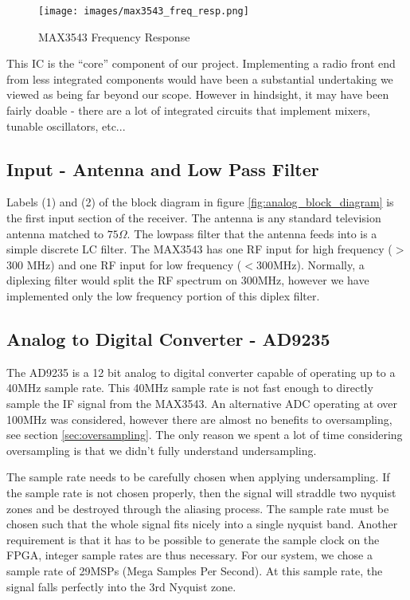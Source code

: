\documentclass[a4paper, 12pt, notitlepage]{article}
\begin{document}
\begin{figure}
  \texttt{[image: images/max3543\_freq\_resp.png]}
  \caption{MAX3543 Frequency Response}
  \label{fig:max3543_freq_resp}
\end{figure}

This IC is the ``core'' component of our project.  Implementing a radio front end from less integrated components would have been a substantial undertaking we viewed as being far beyond our scope.  However in hindsight, it may have been fairly doable - there are a lot of integrated circuits that implement mixers, tunable oscillators, etc...  

\subsection{Input - Antenna and Low Pass Filter}
Labels (1) and (2) of the block diagram in figure \ref{fig:analog_block_diagram} is the first input section of the receiver.  The antenna is any standard television antenna matched to $75\Omega$.  The lowpass filter that the antenna feeds into is a simple discrete LC filter.  The MAX3543 has one RF input for high frequency ($>$300 MHz) and one RF input for low frequency ($<$300MHz).  Normally, a diplexing filter would split the RF spectrum on 300MHz, however we have implemented only the low frequency portion of this diplex filter.

\subsection{Analog to Digital Converter - AD9235}
The AD9235 is a 12 bit analog to digital converter capable of operating up to a 40MHz sample rate.  This 40MHz sample rate is not fast enough to directly sample the IF signal from the MAX3543.  An alternative ADC operating at over 100MHz was considered, however there are almost no benefits to oversampling, see section \ref{sec:oversampling}.  The only reason we spent a lot of time considering oversampling is that we didn't fully understand undersampling.

The sample rate needs to be carefully chosen when applying undersampling.  If the sample rate is not chosen properly, then the signal will straddle two nyquist zones and be destroyed through the aliasing process.  The sample rate must be chosen such that the whole signal fits nicely into a single nyquist band.  Another requirement is that it has to be possible to generate the sample clock on the FPGA, integer sample rates are thus necessary.  For our system, we chose a sample rate of 29MSPs (Mega Samples Per Second).  At this sample rate, the signal falls perfectly into the 3rd Nyquist zone.
\end{document}
